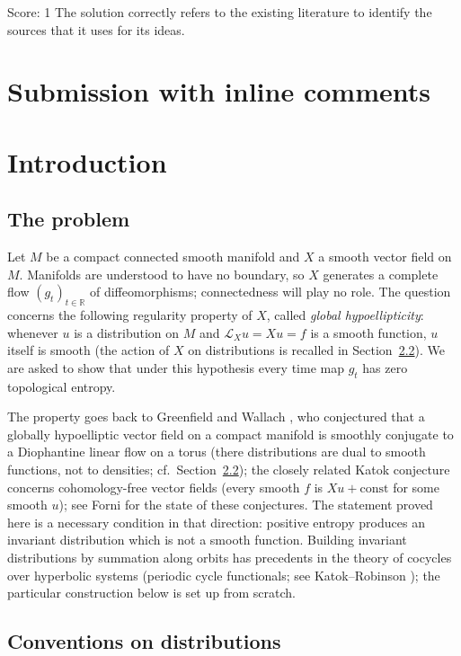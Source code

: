 \documentclass[11pt]{article}
\theoremstyle{remark}
\newcommand{\R}{\mathbb R}
\newcommand{\LX}{\mathcal L_X}
\begin{document}
\noindent Score: 1
The solution correctly refers to the existing literature to identify the sources that it uses for its ideas.

\newpage
\section{Submission with inline comments}


\section{Introduction}
\label{sec:intro}

\subsection{The problem}

Let \(M\) be a compact connected smooth manifold and \(X\) a smooth
vector field on \(M\).  Manifolds are understood to have no
boundary, so \(X\) generates a complete flow \((g_t)_{t\in\R}\) of
diffeomorphisms; connectedness will play no role.  The question concerns the following regularity
property of \(X\), called \emph{global hypoellipticity}: whenever
\(u\) is a distribution on \(M\) and \(\LX u=Xu=f\) is a smooth
function, \(u\) itself is smooth (the action of \(X\) on
distributions is recalled in Section~\ref{sec:conventions}).  We are
asked to show that under this hypothesis every time map \(g_t\) has
zero topological entropy.

The property goes back to Greenfield and Wallach
\cite{GreenfieldWallach1973}, who conjectured that a globally
hypoelliptic vector field on a compact manifold is smoothly conjugate
to a Diophantine linear flow on a torus (there distributions are
dual to smooth functions, not to densities; cf.\
Section~\ref{sec:conventions}); the closely related Katok
conjecture concerns cohomology-free vector fields (every smooth
\(f\) is \(Xu+\mathrm{const}\) for some smooth \(u\)); see Forni
\cite{Forni2008} for the state of these conjectures.
The statement proved here is a necessary condition in that direction:
positive entropy produces an invariant distribution which is not a
smooth function.
Building invariant distributions by summation along orbits has
precedents in the theory of cocycles over hyperbolic systems
(periodic cycle functionals; see Katok--Robinson
\cite{KatokRobinson2001}); the particular construction below is set
up from scratch.

\subsection{Conventions on distributions}
\label{sec:conventions}
\end{document}
